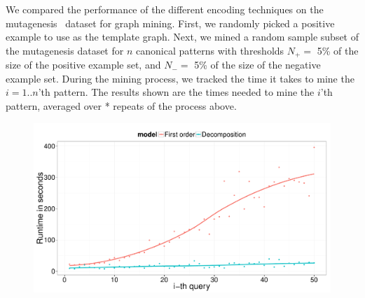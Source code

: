 %
%
%
%
%
%
%
%
We compared the performance of the different encoding techniques on the mutagenesis~\citep{?} dataset for graph mining.
First, we randomly picked a positive example to use as the template graph.
Next, we mined a random sample subset of the mutagenesis dataset for $n$ canonical patterns with thresholds $N_{+} = $ 5\% of the size of the positive example set, and $N_{-} =$ 5\% of the size of the negative example set.
During the mining process, we tracked the time it takes to mine the $i=1..n$'th pattern.
The results shown are the times needed to mine the $i$'th pattern, averaged over * repeats of the process above.
\begin{figure}
\includegraphics[scale=0.20]{extra/figure_comparison_yoshida.pdf}
\end{figure}
